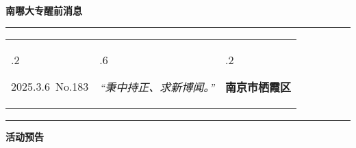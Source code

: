 \documentclass[letterpaper, 12pt]{article}
\begin{document}
\begin{center}
    \Huge\textbf{南哪大专醒前消息}
\end{center}
\vspace{4mm}
\hrule
\renewcommand\tabularxcolumn[1]{m{#1}}
\begin{tabularx}{\textwidth}{>{\hsize.2\hsize}X>{\hsize.6\hsize}X>{\hsize.2\hsize}X}
    \begin{flushleft}
        2025.3.6\, No.183
    \end{flushleft}
    &
    \begin{center}
        \textit{“秉中持正、求新博闻。”}
    \end{center}
    &
    \begin{flushright}
        \textbf{南京市栖霞区}
    \end{flushright}
\end{tabularx}
\vspace{-3.5mm}
\hrule
\vspace{4mm}
\centerline{\huge\textbf{活动预告}}
\end{document}

